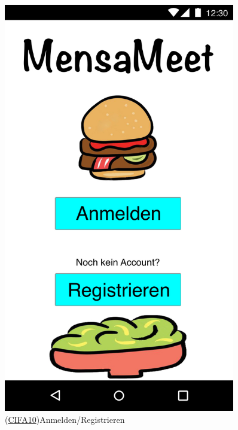 \documentclass[a4paper]{scrreprt}
\begin{document}
\begin{figure}[H]
	\centering 
	\begin{minipage}[b]{0.48\textwidth} 
		\centering 
		\includegraphics[width=0.9\textwidth]{res/GUI/01.jpeg} 
		\label{Fig.1}
		(\hyperlink{cifa10}{CIFA10})Anmelden/Registrieren
	\end{minipage}
	\begin{minipage}[b]{0.48\textwidth} 
		\centering 

\end{minipage}
\end{figure}
\end{document}
